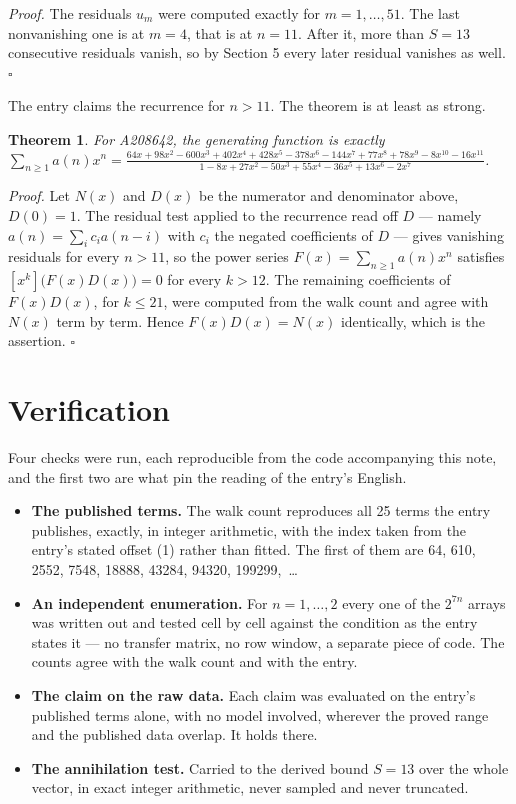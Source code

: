 \documentclass[11pt]{article}
\newtheorem{theorem}{Theorem}
\theoremstyle{definition}
\begin{document}
{\itshape Proof.} The residuals $u_m$ were computed exactly for $m = 1,\dots,51$. The last nonvanishing one is at $m = 4$, that is at $n = 11$. After it, more than $S = 13$ consecutive residuals vanish, so by Section 5 every later residual vanishes as well. $\square$

The entry claims the recurrence for $n > 11$. The theorem is at least as strong.

\begin{theorem} For A208642, the generating function is exactly $\sum_{n\ge 1} a(n)x^n = \frac{64x + 98x^{2} - 600x^{3} + 402x^{4} + 428x^{5} - 378x^{6} - 144x^{7} + 77x^{8} + 78x^{9} - 8x^{10} - 16x^{11}}{1 - 8x + 27x^{2} - 50x^{3} + 55x^{4} - 36x^{5} + 13x^{6} - 2x^{7}}$.\end{theorem}

{\itshape Proof.} Let $N(x)$ and $D(x)$ be the numerator and denominator above, $D(0)=1$. The residual test applied to the recurrence read off $D$ --- namely $a(n) = \sum_i c_i a(n-i)$ with $c_i$ the negated coefficients of $D$ --- gives vanishing residuals for every $n > 11$, so the power series $F(x)=\sum_{n\ge 1}a(n)x^n$ satisfies $[x^k]\bigl(F(x)D(x)\bigr) = 0$ for every $k > 12$. The remaining coefficients of $F(x)D(x)$, for $k \le 21$, were computed from the walk count and agree with $N(x)$ term by term. Hence $F(x)D(x) = N(x)$ identically, which is the assertion. $\square$

\section{Verification}

Four checks were run, each reproducible from the code accompanying this note, and the first two are what pin the reading of the entry's English.

\begin{itemize}

\item {\bfseries The published terms.} The walk count reproduces all 25 terms the entry publishes, exactly, in integer arithmetic, with the index taken from the entry's stated offset (1) rather than fitted. The first of them are 64, 610, 2552, 7548, 18888, 43284, 94320, 199299,~\dots

\item {\bfseries An independent enumeration.} For $n = 1,\dots,2$ every one of the $2^{7n}$ arrays was written out and tested cell by cell against the condition as the entry states it --- no transfer matrix, no row window, a separate piece of code. The counts agree with the walk count and with the entry.

\item {\bfseries The claim on the raw data.} Each claim was evaluated on the entry's published terms alone, with no model involved, wherever the proved range and the published data overlap. It holds there.

\item {\bfseries The annihilation test.} Carried to the derived bound $S = 13$ over the whole vector, in exact integer arithmetic, never sampled and never truncated.

\end{itemize}
\end{document}
